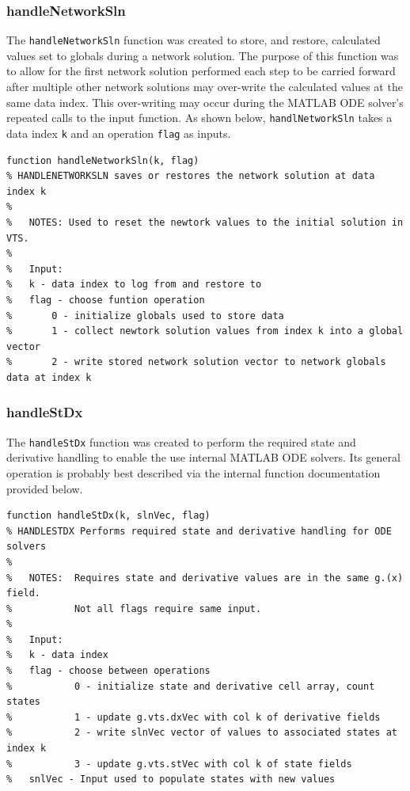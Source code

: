 \subsubsection{handleNetworkSln}  
The \verb|handleNetworkSln| function was created to store, and restore, calculated values set to globals during a network solution.
The purpose of this function was to allow for the first network solution performed each step to be carried forward after multiple other network solutions may over-write the calculated values at the same data index.
This over-writing may occur during the MATLAB ODE solver's repeated calls to the input function.
As shown below, \verb|handlNetworkSln| takes a data index \verb|k| and an operation \verb|flag| as inputs.

\begin{verbatim}
function handleNetworkSln(k, flag)
% HANDLENETWORKSLN saves or restores the network solution at data index k
%
%   NOTES: Used to reset the newtork values to the initial solution in VTS.
%
%   Input:
%   k - data index to log from and restore to
%   flag - choose funtion operation
%       0 - initialize globals used to store data
%       1 - collect newtork solution values from index k into a global vector
%       2 - write stored network solution vector to network globals data at index k
\end{verbatim}

\subsubsection{handleStDx}  
The \verb|handleStDx| function was created to perform the required state and derivative handling to enable the use internal MATLAB ODE solvers.
Its general operation is probably best described via the internal function documentation provided below.

\begin{verbatim}
function handleStDx(k, slnVec, flag)
% HANDLESTDX Performs required state and derivative handling for ODE solvers
%
%   NOTES:  Requires state and derivative values are in the same g.(x) field.
%           Not all flags require same input.
%
%   Input:
%   k - data index
%   flag - choose between operations
%           0 - initialize state and derivative cell array, count states
%           1 - update g.vts.dxVec with col k of derivative fields
%           2 - write slnVec vector of values to associated states at index k
%           3 - update g.vts.stVec with col k of state fields
%   snlVec - Input used to populate states with new values
\end{verbatim}

